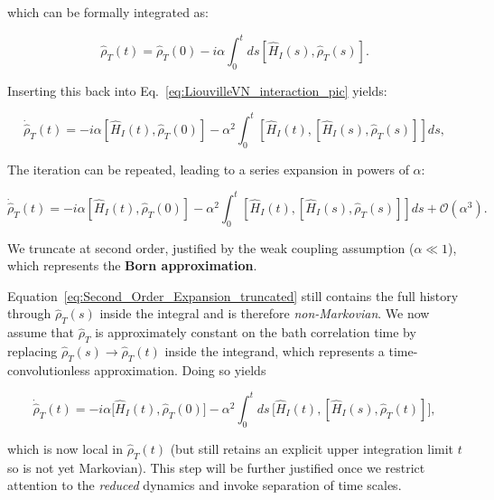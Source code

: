 \noindent
which can be formally integrated as:

\begin{equation}
	\hat{\rho}_T(t) = \hat{\rho}_T(0) - i \alpha \int_0^t ds [\hat{H}_I(s), \hat{\rho}_T(s)].
	\label{eq:Formal_Integration}
\end{equation}

\noindent
Inserting this back into Eq.~\eqref{eq:LiouvilleVN_interaction_pic} yields:

\begin{equation}
	\dot{\hat{\rho}}_T(t) = -i \alpha \left[ \hat{H}_I(t), \hat{\rho}_T(0) \right]
	- \alpha^2 \int_0^t \left[ \hat{H}_I(t), \left[ \hat{H}_I(s), \hat{\rho}_T(s) \right] \right] ds,
	\label{eq:Second_Order_Expansion}
\end{equation}

\noindent
The iteration can be repeated, leading to a series expansion in powers of $\alpha$:

\begin{equation}
	\dot{\hat{\rho}}_T(t) = -i \alpha \left[ \hat{H}_I(t), \hat{\rho}_T(0) \right]
	- \alpha^2 \int_0^t \left[ \hat{H}_I(t), \left[ \hat{H}_I(s), \hat{\rho}_T(s) \right] \right] ds + \mathcal{O} (\alpha^3).
	\label{eq:Second_Order_Expansion_truncated}
\end{equation}

\noindent
We truncate at second order, justified by the weak coupling assumption ($\alpha \ll 1$), which represents the \textbf{Born approximation}.

\noindent
Equation~\eqref{eq:Second_Order_Expansion_truncated} still contains the full history through $\hat{\rho}_T(s)$ inside the integral and is therefore \emph{non-Markovian}. We now assume that $\hat{\rho}_T$ is approximately constant on the bath correlation time by replacing $\hat{\rho}_T(s) \to \hat{\rho}_T(t)$ inside the integrand, which represents a time-convolutionless approximation. Doing so yields

\begin{equation}
	\dot{\hat{\rho}}_T(t) = -i \alpha \big[ \hat{H}_I(t), \hat{\rho}_T(0) \big]
	- \alpha^2 \int_0^t ds\, \big[ \hat{H}_I(t), [ \hat{H}_I(s), \hat{\rho}_T(t)] \big],
	\label{eq:Second_Order_Expansion_wo_third}
\end{equation}

\noindent
which is now local in $\hat{\rho}_T(t)$ (but still retains an explicit upper integration limit $t$ so is not yet Markovian). This step will be further justified once we restrict attention to the \emph{reduced} dynamics and invoke separation of time scales.


